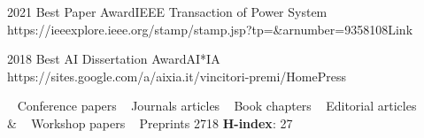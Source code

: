 \documentclass[localFont,alternative]{documentMETADATA}
\def\citNo{2718}
\def\hIndex{27}
\begin{document}
\begin{awards}
		
	\awardentry
	{2021}
	{Best Paper Award}{IEEE Transaction of Power System}
	{https://ieeexplore.ieee.org/stamp/stamp.jsp?tp=\&arnumber=9358108}{Link}

	\awardentry
	{2018}
	{Best AI Dissertation Award}{AI*IA} %
	{https://sites.google.com/a/aixia.it/vincitori-premi/Home}{Press}


\end{awards}	



\begin{keywords}
{			 \faAngleRight~  Conference papers
\hspace{4pt} \faAngleRight~  Journals articles
\hspace{4pt} \faAngleRight~  Book chapters
\hspace{4pt} \faAngleRight~  Editorial articles
		 \\& \faAngleRight~  Workshop papers
\hspace{4pt} \faAngleRight~  Preprints
}
{\citNo \hspace{8pt} 
 \textbf{H-index}: \hIndex \hspace{8pt} 
 }%
\end{keywords}
\end{document}

